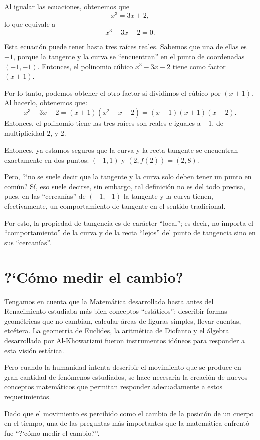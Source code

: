 Al igualar las ecuaciones, obtenemos que
\[
x^3 = 3x + 2,
\]
lo que equivale a
\[
x^3 - 3x - 2 = 0.
\]

Esta ecuación puede tener hasta tres raíces reales. Sabemos que una de ellas es $-1$, porque la
tangente y la curva se ``encuentran'' en el punto de coordenadas $(-1,-1)$. Entonces, el polinomio
cúbico $x^3 - 3x - 2$ tiene como factor $(x + 1)$.

Por lo tanto, podemos obtener el otro factor si dividimos el cúbico por $(x + 1)$. Al hacerlo,
obtenemos que:
\[
x^3 - 3x - 2 = (x + 1)(x^2 - x - 2) = (x+1)(x + 1)(x - 2).
\]
Entonces, el polinomio tiene las tres raíces son reales e iguales a $-1$, de multiplicidad $2$, y
$2$.

Entonces, ya estamos seguros que la curva y la recta tangente se encuentran exactamente en dos
puntos: $(-1,1)$ y $(2,f(2)) = (2,8)$.

Pero, ?`no se suele decir que la tangente y la curva solo deben tener un punto en común? Sí, eso
suele decirse, sin embargo, tal definición no es del todo precisa, pues, en las ``cercanías'' de
$(-1,-1)$ la tangente y la curva tienen, efectivamente, un comportamiento de tangente en el sentido
tradicional.

Por esto, la propiedad de tangencia es de carácter ``local''; es decir, no importa el
``comportamiento'' de la curva y de la recta ``lejos'' del punto de tangencia sino en sus
``cercanías''.


\section{?`Cómo medir el cambio?}

Tengamos en cuenta que la Matemática desarrollada hasta antes del Renacimiento estudiaba más bien
conceptos ``estáticos'': describir formas geométricas que no cambian, calcular áreas de figuras
simples, llevar cuentas, etcétera. La geometría de Euclides, la aritmética de Diofanto y el álgebra
desarrollada por Al-Khowarizmi fueron instrumentos idóneos para responder a esta visión estática.

Pero cuando la humanidad intenta describir el movimiento que se produce en gran cantidad de
fenómenos estudiados, se hace necesaria la creación de nuevos conceptos matemáticos que permitan
responder adecuadamente a estos requerimientos.

Dado que el movimiento es percibido como el cambio de la posición de un cuerpo en el tiempo, una de
las preguntas más importantes que la matemática enfrentó fue ``?`cómo medir el cambio?''.

